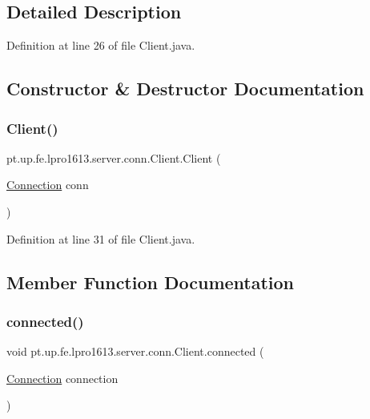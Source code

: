 \subsection{Detailed Description}


Definition at line 26 of file Client.\+java.



\subsection{Constructor \& Destructor Documentation}
\hypertarget{classpt_1_1up_1_1fe_1_1lpro1613_1_1server_1_1conn_1_1_client_a057095008df340effc95b69dbda5b643}{}\label{classpt_1_1up_1_1fe_1_1lpro1613_1_1server_1_1conn_1_1_client_a057095008df340effc95b69dbda5b643} 
\subsubsection{\texorpdfstring{Client()}{Client()}}
{\footnotesize\ttfamily pt.\+up.\+fe.\+lpro1613.\+server.\+conn.\+Client.\+Client (\begin{DoxyParamCaption}\item[{\hyperlink{classpt_1_1up_1_1fe_1_1lpro1613_1_1sharedlib_1_1conn_1_1_connection}{Connection}}]{conn }\end{DoxyParamCaption})}



Definition at line 31 of file Client.\+java.



\subsection{Member Function Documentation}
\hypertarget{classpt_1_1up_1_1fe_1_1lpro1613_1_1server_1_1conn_1_1_client_a1cf160e68d7310d9f0b3a53d8b26f80d}{}\label{classpt_1_1up_1_1fe_1_1lpro1613_1_1server_1_1conn_1_1_client_a1cf160e68d7310d9f0b3a53d8b26f80d} 
\subsubsection{\texorpdfstring{connected()}{connected()}}
{\footnotesize\ttfamily void pt.\+up.\+fe.\+lpro1613.\+server.\+conn.\+Client.\+connected (\begin{DoxyParamCaption}\item[{\hyperlink{classpt_1_1up_1_1fe_1_1lpro1613_1_1sharedlib_1_1conn_1_1_connection}{Connection}}]{connection }\end{DoxyParamCaption})}


